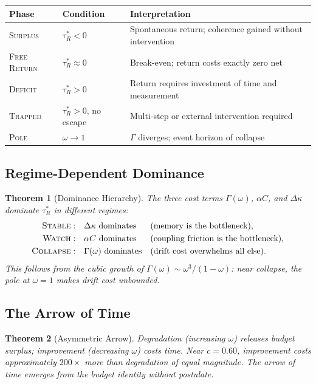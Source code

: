 \documentclass[
  aps,
  prd,
  preprint,
  superscriptaddress,
  nofootinbib,
  floatfix,
  longbibliography
]{revtex4-2}
\newtheorem{theorem}{Theorem}
\newcommand{\tRstar}{\tau_{\!R}^{*}}
\newcommand{\Gam}{\Gamma}
\newcommand{\regime}[1]{\textrm{\upshape\scshape#1}}
\newcommand{\Drft}{\omega}
\newcommand{\Curv}{C}
\newcommand{\Logint}{\kappa}
\begin{document}
\begin{center}
\begin{tabular}{@{}llp{6.5cm}@{}}
\toprule
\textbf{Phase} & \textbf{Condition} & \textbf{Interpretation} \\
\midrule
\regime{Surplus}     & $\tRstar < 0$ &
  Spontaneous return; coherence gained without intervention \\
\regime{Free Return} & $\tRstar \approx 0$ &
  Break-even; return costs exactly zero net \\
\regime{Deficit}     & $\tRstar > 0$ &
  Return requires investment of time and measurement \\
\regime{Trapped}     & $\tRstar > 0$, no escape &
  Multi-step or external intervention required \\
\regime{Pole}        & $\Drft \to 1$ &
  $\Gam$ diverges; event horizon of collapse \\
\bottomrule
\end{tabular}
\end{center}

\subsection{Regime-Dependent Dominance}

\begin{theorem}[Dominance Hierarchy]\label{thm:dominance}
The three cost terms $\Gam(\Drft)$, $\alpha\Curv$, and
$\Delta\Logint$ dominate $\tRstar$ in different regimes:
\begin{align}
  \regime{Stable}: &\quad \Delta\Logint \text{ dominates}
    &&\text{(memory is the bottleneck)}, \nonumber\\
  \regime{Watch}: &\quad \alpha\Curv \text{ dominates}
    &&\text{(coupling friction is the bottleneck)}, \nonumber\\
  \regime{Collapse}: &\quad \Gam(\Drft) \text{ dominates}
    &&\text{(drift cost overwhelms all else)}.
\end{align}
This follows from the cubic growth of $\Gam(\Drft)
\sim \Drft^3/(1-\Drft)$: near collapse, the pole at
$\Drft = 1$ makes drift cost unbounded.
\end{theorem}

\subsection{The Arrow of Time}

\begin{theorem}[Asymmetric Arrow]\label{thm:arrow}
Degradation (increasing $\Drft$) releases budget surplus;
improvement (decreasing $\Drft$) costs time.
Near $c = 0.60$, improvement costs approximately
$200\times$ more than degradation of equal magnitude.
The arrow of time emerges from the budget identity
without postulate.
\end{theorem}
\end{document}
